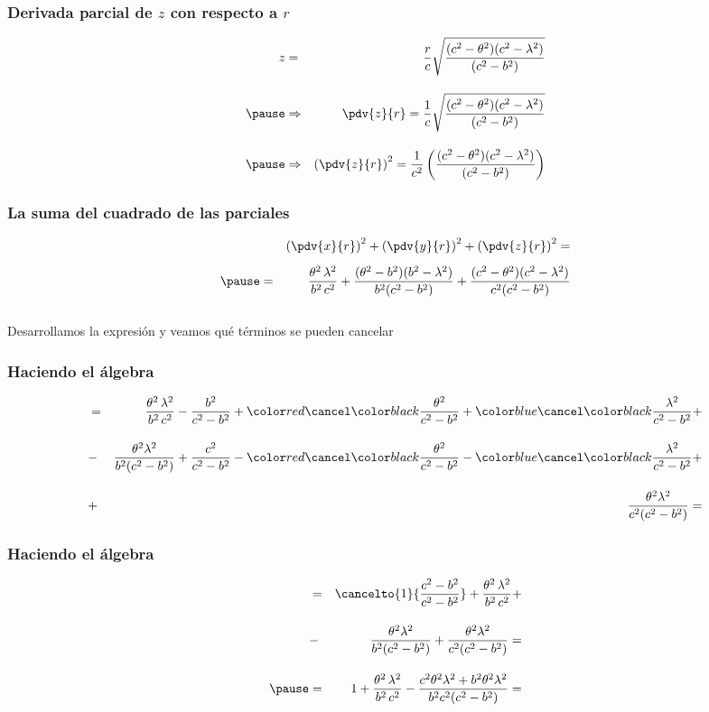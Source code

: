 \begin{frame}
\frametitle{Derivada parcial de $z$ con respecto a $r$}
\begin{eqnarray*}
z &=& \dfrac{r}{c} \sqrt{\dfrac{(c^{2} - \theta^{2})(c^{2} - \lambda^{2})}{(c^{2} - b^{2})}} \\[1em] \pause
&\Rightarrow& \hspace{0.3cm} \displaystyle \pdv{z}{r} = \dfrac{1}{c} \sqrt{\dfrac{(c^{2} - \theta^{2})(c^{2} - \lambda^{2})}{(c^{2} - b^{2})}} \\[1em] \pause
&\Rightarrow& \left( \pdv{z}{r} \right)^{2} = \dfrac{1}{c^{2}} \left( \dfrac{(c^{2} - \theta^{2})(c^{2} - \lambda^{2})}{(c^{2} - b^{2})} \right)
\end{eqnarray*}
\end{frame}
\begin{frame}
\frametitle{La suma del cuadrado de las parciales}
\begin{eqnarray*}
&{}& \left( \pdv{x}{r} \right)^{2} + \left( \pdv{y}{r} \right)^{2} + \left( \pdv{z}{r} \right)^{2} = \\[0.5em] \pause
&=& \dfrac{\theta^{2} \, \lambda^{2}}{b^{2} \, c^{2}} + \dfrac{(\theta^{2} - b^{2})(b^{2} - \lambda^{2})}{b^{2} (c^{2} - b^{2})} + \dfrac{(c^{2} - \theta^{2})(c^{2} - \lambda^{2})}{c^{2} (c^{2} - b^{2})}
\end{eqnarray*}
\\
\bigskip
\pause
Desarrollamos la expresión y veamos qué términos se pueden cancelar
\end{frame}
\begin{frame}
\frametitle{Haciendo el álgebra}
\begin{eqnarray*}
&=& \dfrac{\theta^{2} \, \lambda^{2}}{b^{2} \, c^{2}} - \dfrac{b^{2}}{c^{2} - b^{2}} + \Cancel[red]{\dfrac{\theta^{2}}{c^{2} - b^{2}}} + \Cancel[blue]{\dfrac{\lambda^{2}}{c^{2} - b^{2}}} + \\[1em]
&-& \dfrac{\theta^{2} \lambda^{2}}{b^{2} (c^{2} - b^{2})} + \dfrac{c^{2}}{c^{2} - b^{2}} - \Cancel[red]{\dfrac{\theta^{2}}{c^{2} - b^{2}}} - \Cancel[blue]{\dfrac{\lambda^{2}}{c^{2} - b^{2}}} + \\[1em]
&+& \dfrac{\theta^{2} \lambda^{2}}{c^{2} (c^{2} - b^{2})} = 
\end{eqnarray*}
\end{frame}
\begin{frame}
\frametitle{Haciendo el álgebra}
\begin{eqnarray*}
&=& \cancelto{1}{\dfrac{c^{2} - b^{2}}{c^{2} - b^{2}}} + \dfrac{\theta^{2} \, \lambda^{2}}{b^{2} \, c^{2}} + \\[1em]
&-& \dfrac{\theta^{2} \lambda^{2}}{b^{2} (c^{2} - b^{2})} + \dfrac{\theta^{2} \lambda^{2}}{c^{2} (c^{2} - b^{2})} = \\[1em] \pause
&=& 1 + \dfrac{\theta^{2} \, \lambda^{2}}{b^{2} \, c^{2}} - \dfrac{c^{2} \theta^{2} \lambda^{2} + b^{2} \theta^{2} \lambda^{2}}{b^{2} c^{2} (c^{2} - b^{2})} = 
\end{eqnarray*}
\end{frame}

